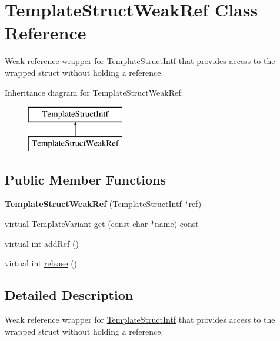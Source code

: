 \hypertarget{class_template_struct_weak_ref}{}\section{Template\+Struct\+Weak\+Ref Class Reference}
\label{class_template_struct_weak_ref}


Weak reference wrapper for \mbox{\hyperlink{class_template_struct_intf}{Template\+Struct\+Intf}} that provides access to the wrapped struct without holding a reference.  


Inheritance diagram for Template\+Struct\+Weak\+Ref\+:\begin{figure}[H]
\begin{center}
\leavevmode
\includegraphics[height=2.000000cm]{class_template_struct_weak_ref}
\end{center}
\end{figure}
\subsection*{Public Member Functions}
\begin{DoxyCompactItemize}
\item 
\mbox{\label{class_template_struct_weak_ref_a50a7697a75c8d12ac00db4b13b4ae02e}} 
{\bfseries Template\+Struct\+Weak\+Ref} (\mbox{\hyperlink{class_template_struct_intf}{Template\+Struct\+Intf}} $\ast$ref)
\item 
virtual \mbox{\hyperlink{class_template_variant}{Template\+Variant}} \mbox{\hyperlink{class_template_struct_weak_ref_aa858d11ac114c0c0254c607a8f1ce817}{get}} (const char $\ast$name) const
\item 
virtual int \mbox{\hyperlink{class_template_struct_weak_ref_a75d43b840dbfbd6b4ef6ca78bd13c015}{add\+Ref}} ()
\item 
virtual int \mbox{\hyperlink{class_template_struct_weak_ref_a70d7485ae68266ce08e5a24058a30fe8}{release}} ()
\end{DoxyCompactItemize}


\subsection{Detailed Description}
Weak reference wrapper for \mbox{\hyperlink{class_template_struct_intf}{Template\+Struct\+Intf}} that provides access to the wrapped struct without holding a reference. 

